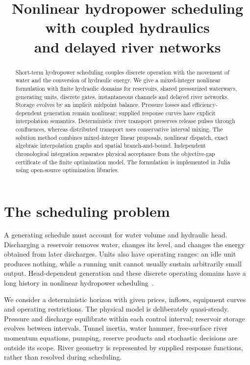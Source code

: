 \documentclass[10pt,a4paper]{article}
\title{Nonlinear hydropower scheduling with coupled hydraulics\\
and delayed river networks}
\author{}
\date{}
\begin{document}
\maketitle
\vspace{-2em}
\begin{abstract}
Short-term hydropower scheduling couples discrete operation with the movement
of water and the conversion of hydraulic energy. We give a mixed-integer
nonlinear formulation with finite hydraulic domains for reservoirs, shared pressurized
waterways, generating units, discrete gates, instantaneous channels and
delayed river networks. Storage evolves by an implicit midpoint balance.
Pressure losses and efficiency-dependent generation remain nonlinear;
supplied response curves have explicit interpolation semantics.
Deterministic river transport preserves release pulses through confluences,
whereas distributed transport uses conservative interval mixing.
The solution method combines mixed-integer linear proposals, nonlinear
dispatch, exact algebraic interpolation graphs and spatial branch-and-bound.
Independent chronological integration separates physical acceptance from
the objective-gap certificate of the finite optimization model. The
formulation is implemented in Julia using open-source optimization libraries.
\end{abstract}

\section{The scheduling problem}

A generating schedule must account for water volume and hydraulic head.
Discharging a reservoir removes water, changes its level, and changes the
energy obtained from later discharges. Units also have operating ranges:
an idle unit produces nothing, while a running unit cannot usually sustain
arbitrarily small output. Head-dependent generation and these discrete
operating domains have a long history in nonlinear hydropower
scheduling~\cite{catalao}.

We consider a deterministic horizon with given prices, inflows, equipment
curves and operating restrictions. The physical model is deliberately
quasi-steady. Pressure and discharge equilibrate within each control
interval; reservoir storage evolves between intervals. Tunnel inertia,
water hammer, free-surface river momentum equations, pumping, reserve
products and stochastic decisions are outside its scope. River geometry is
represented by supplied response functions, rather than resolved during
scheduling.
\end{document}
